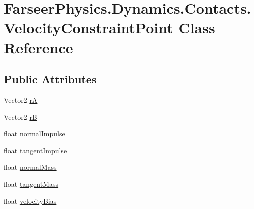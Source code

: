 \hypertarget{class_farseer_physics_1_1_dynamics_1_1_contacts_1_1_velocity_constraint_point}{\section{Farseer\+Physics.\+Dynamics.\+Contacts.\+Velocity\+Constraint\+Point Class Reference}
\label{class_farseer_physics_1_1_dynamics_1_1_contacts_1_1_velocity_constraint_point}
}
\subsection*{Public Attributes}
\begin{DoxyCompactItemize}
\item 
Vector2 \hyperlink{class_farseer_physics_1_1_dynamics_1_1_contacts_1_1_velocity_constraint_point_a48f29bbe2d838654a7b711345ce00bcb}{r\+A}
\item 
Vector2 \hyperlink{class_farseer_physics_1_1_dynamics_1_1_contacts_1_1_velocity_constraint_point_a8b20bfac096be220595cab0d733987a3}{r\+B}
\item 
float \hyperlink{class_farseer_physics_1_1_dynamics_1_1_contacts_1_1_velocity_constraint_point_a1ff1252a20f6c88394de79edbd7a932b}{normal\+Impulse}
\item 
float \hyperlink{class_farseer_physics_1_1_dynamics_1_1_contacts_1_1_velocity_constraint_point_a6214fcd415ac354d8615d71b6eef6bc2}{tangent\+Impulse}
\item 
float \hyperlink{class_farseer_physics_1_1_dynamics_1_1_contacts_1_1_velocity_constraint_point_a3aae689600dd3a15d6e3d6594d8ca2af}{normal\+Mass}
\item 
float \hyperlink{class_farseer_physics_1_1_dynamics_1_1_contacts_1_1_velocity_constraint_point_a84eef42a23bbeab249c5ef312f4bf095}{tangent\+Mass}
\item 
float \hyperlink{class_farseer_physics_1_1_dynamics_1_1_contacts_1_1_velocity_constraint_point_a1314b28dc03d13ef54cc872717cff261}{velocity\+Bias}
\end{DoxyCompactItemize}


